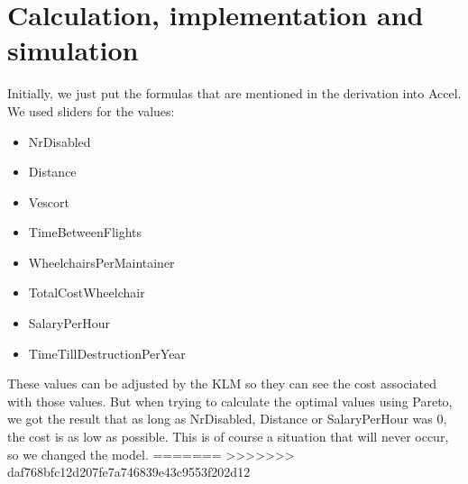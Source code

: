 \documentclass[a4paper, 11pt, notitlepage]{report}
\begin{document}
\section{Calculation, implementation and simulation}
    Initially, we just put the formulas that are mentioned in the derivation into Accel. We used sliders for the values:
    \begin{itemize}
    \itemsep0em
    \item NrDisabled
    \item Distance
    \item Vescort
    \item TimeBetweenFlights
    \item WheelchairsPerMaintainer
    \item TotalCostWheelchair
    \item SalaryPerHour
    \item TimeTillDestructionPerYear
    \end{itemize}
    These values can be adjusted by the KLM so they can see the cost associated with those values. But when trying to calculate the optimal values using Pareto, we got the result that as long as NrDisabled, Distance or SalaryPerHour was 0, the cost is as low as possible. This is of course a situation that will never occur, so we changed the model. 
=======
>>>>>>> daf768bfc12d207fe7a746839e43c9553f202d12

\end{document}
